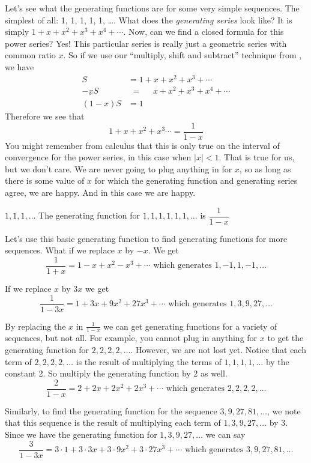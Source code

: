\documentclass[12pt]{article}
\begin{document}
Let's see what the generating functions are for some very simple sequences.  The simplest of all: 1, 1, 1, 1, 1, \ldots.  What does the {\em generating series} look like?  It is simply $1 + x + x^2 + x^3 + x^4 + \cdots$.  Now, can we find a closed formula for this power series? Yes!  This particular series is really just a geometric series with common ratio $x$.  So if we use our ``multiply, shift and subtract'' technique from , we have
 \begin{align*}
  S & = 1 + x + x^2 + x^3 + \cdots \\
  \underline{- xS} & \underline{\,\, = ~~~~~~ x + x^2 + x^3 + x^4 + \cdots} \\
  (1-x)S & = 1
 \end{align*}
Therefore we see that
 \[1 + x + x^2 + x^3 \cdots = \dfrac{1}{1-x}\]
You might remember from calculus that this is only true on the interval of convergence for the power series, in this case when $|x| < 1$.  That is true for us, but we don't care.  We are never going to plug anything in for $x$, so as long as there is some value of $x$ for which the generating function and generating series agree, we are happy. And in this case we are happy.

 \begin{defbox}{$1,1,1,\ldots$}
  The generating function for $1,1,1,1,1,1,\ldots$ is $\dfrac{1}{1-x}$
 \end{defbox}

  Let's use this basic generating function to find generating functions for more sequences.  What if we replace $x$ by $-x$.  We get
 \[\frac{1}{1+x} = 1 - x + x^2 - x^3 + \cdots \mbox{ which generates } 1, -1, 1, -1, \ldots\]

 If we replace $x$ by $3x$ we get
 \[\frac{1}{1-3x} = 1 + 3x + 9x^2 + 27x^3 + \cdots \mbox{ which generates } 1, 3, 9, 27, \ldots\]

 By replacing the $x$ in $\frac{1}{1-x}$ we can get generating functions for a variety of sequences, but not all.  For example, you cannot plug in anything for $x$ to get the generating function for $2,2,2,2, \ldots$.  However, we are not lost yet.  Notice that each term of $2, 2, 2, 2, \ldots$ is the result of multiplying the terms of $1, 1, 1, 1, \ldots$ by the constant 2.  So multiply the generating function by 2 as well.
 \[\frac{2}{1-x} = 2 + 2x + 2x^2 + 2x^3 + \cdots \mbox{ which generates } 2, 2, 2, 2, \ldots\]

Similarly, to find the generating function for the sequence $3, 9, 27, 81, \ldots$, we note that this sequence is the result of multiplying each term of $1, 3, 9, 27, \ldots$ by 3.  Since we have the generating function for $1, 3, 9, 27, \ldots$ we can say
\[\frac{3}{1-3x} = 3\cdot 1 + 3\cdot 3x + 3\cdot 9x^2 + 3\cdot 27x^3 + \cdots \mbox{ which generates } 3, 9, 27, 81, \ldots\]
\end{document}
